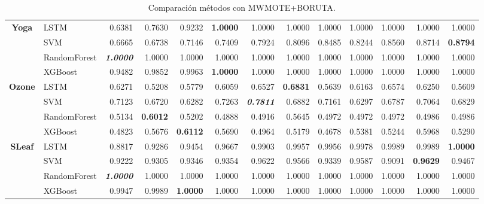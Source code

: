\begin{table}[H]
\begin{adjustbox}{max width=14cm}
\begin{tabular}{|c|l|r|r|r|r|r|r|r|r|r|r|r|}
			\hline
			\textbf{Yoga}         & LSTM         & 0.6381          & 0.7630 & 0.9232 & \textbf{1.0000} & 1.0000          & 1.0000          & 1.0000 & 1.0000 & 1.0000          & 1.0000 & 1.0000          \\
			                      & SVM          & 0.6665          & 0.6738 & 0.7146 & 0.7409          & 0.7924          & 0.8096          & 0.8485 & 0.8244 & 0.8560          & 0.8714 & \textbf{0.8794}          \\
			                      & RandomForest & \textit{\textbf{1.0000}} & 1.0000 & 1.0000 & 1.0000          & 1.0000          & 1.0000          & 1.0000 & 1.0000 & 1.0000          & 1.0000 & 1.0000          \\
			                      & XGBoost      & 0.9482          & 0.9852 & 0.9963 & \textbf{1.0000}          & 1.0000          & 1.0000          & 1.0000 & 1.0000 & 1.0000          & 1.0000 & 1.0000          \\
			\hline
			\textbf{Ozone}        & LSTM         & 0.6271          & 0.5208 & 0.5779 & 0.6059          & 0.6527          & \textbf{0.6831}          & 0.5639 & 0.6163 & 0.6574          & 0.6250 & 0.5609          \\
			                      & SVM          & 0.7123          & 0.6720 & 0.6282 & 0.7263          & \textit{\textbf{0.7811}} & 0.6882          & 0.7161 & 0.6297 & 0.6787          & 0.7064 & 0.6829          \\
			                      & RandomForest & 0.5134          & \textbf{0.6012} & 0.5202 & 0.4888          & 0.4916          & 0.5645          & 0.4972 & 0.4972 & 0.4972          & 0.4986 & 0.4986          \\
			                      & XGBoost      & 0.4823          & 0.5676 & \textbf{0.6112} & 0.5690          & 0.4964          & 0.5179          & 0.4678 & 0.5381 & 0.5244          & 0.5968 & 0.5290          \\
			\hline
			\textbf{SLeaf}        & LSTM         & 0.8817          & 0.9286 & 0.9454 & 0.9667          & 0.9903          & 0.9957          & 0.9956 & 0.9978 & 0.9989          & 0.9989 & \textbf{1.0000} \\
			                      & SVM          & 0.9222          & 0.9305 & 0.9346 & 0.9354          & 0.9622          & 0.9566          & 0.9339 & 0.9587 & 0.9091          & \textbf{0.9629} & 0.9467          \\
			                      & RandomForest & \textit{\textbf{1.0000}} & 1.0000 & 1.0000 & 1.0000          & 1.0000          & 1.0000          & 1.0000 & 1.0000 & 1.0000          & 1.0000 & 1.0000          \\
			                      & XGBoost      & 0.9947          & 0.9989 & \textbf{1.0000} & 1.0000          & 1.0000          & 1.0000          & 1.0000 & 1.0000 & 1.0000          & 1.0000 & 1.0000          \\
			\hline
		\end{tabular}
	\end{adjustbox}
	\caption{Comparación métodos con MWMOTE+BORUTA.}
	\label{tab:all_comp_mwmote_boruta}
\end{table}


